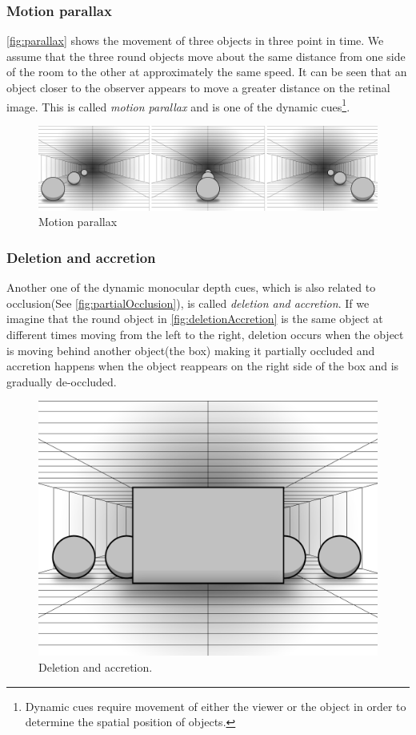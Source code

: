 \subsubsection{Motion parallax}\label{parallax}
\autoref{fig:parallax} shows the movement of three objects in three point in time. We assume that the three round objects move about the same distance from one side of the room to the other at approximately the same speed. It can be seen that an object closer to the observer appears to move a greater distance on the retinal image. This is called \textit{motion parallax} and is one of the dynamic cues\footnote{Dynamic cues require movement of either the viewer or the object in order to determine the spatial position of objects\citep{sensationPerception}.}\citep[p.~204]{sensationPerception}.
\begin{figure}[H]
	\centering
	\includegraphics[width=1\linewidth]{figure/Analysis/parallax.png}
	\caption{Motion parallax}
	\label{fig:parallax}
\end{figure}

\subsubsection{Deletion and accretion}
Another one of the dynamic monocular depth cues, which is also related to occlusion(See \autoref{fig:partialOcclusion}), is called \textit{deletion and accretion}. If we imagine that the round object in \autoref{fig:deletionAccretion} is the same object at different times moving from the left to the right, deletion occurs when the object is moving behind another object(the box) making it partially occluded and accretion happens when the object reappears on the right side of the box and is gradually de-occluded\citep[p.~207]{sensationPerception}.
\begin{figure}[H]
	\centering
	\includegraphics[width=0.8\linewidth]{figure/Analysis/deletionAccretion.png}
	\caption{Deletion and accretion.}
	\label{fig:deletionAccretion}
\end{figure}


